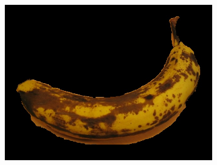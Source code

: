 \documentclass[a4paper,11]{article}
\begin{document}
\begin{center}
\begin{figure}[H]
\begin{subfigure}{0.33\textwidth}
      \includegraphics[width=0.9\linewidth]{results/banana1}
    \end{subfigure}\\
    \vspace{1em}
    

\end{figure}
\end{center}
\end{document}
